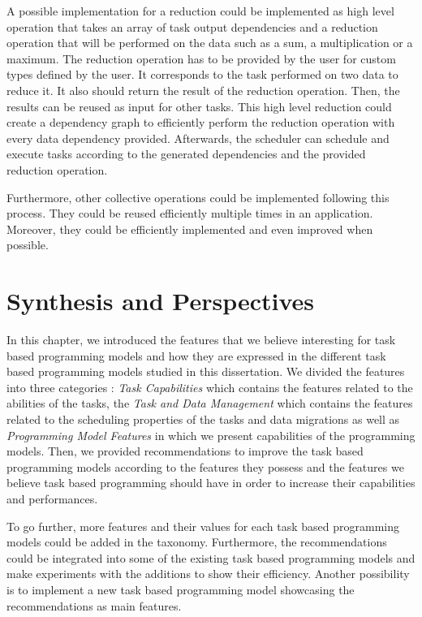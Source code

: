 A possible implementation for a reduction could be implemented as high level operation that takes an array of task output dependencies and a reduction operation that will be performed on the data such as a sum, a multiplication or a maximum.
The reduction operation has to be provided by the user for custom types defined by the user.
It corresponds to the task performed on two data to reduce it.
It also should return the result of the reduction operation.
Then, the results can be reused as input for other tasks.
This high level reduction could create a dependency graph to efficiently perform the reduction operation with every data dependency provided.
Afterwards, the scheduler can schedule and execute tasks according to the generated dependencies and the provided reduction operation.

Furthermore, other collective operations could be implemented following this process.
They could be reused efficiently multiple times in an application.
Moreover, they could be efficiently implemented and even improved when possible.

\section{Synthesis and Perspectives}
In this chapter, we introduced the features that we believe interesting for task based programming models and how they are expressed in the different task based programming models studied in this dissertation.
We divided the features into three categories : \textit{Task Capabilities} which contains the features related to the abilities of the tasks, the \textit{Task and Data Management} which contains the features related to the scheduling properties of the tasks and data migrations as well as \textit{Programming Model Features} in which we present capabilities of the programming models.
Then, we provided recommendations to improve the task based programming models according to the features they possess and the features we believe task based programming should have in order to increase their capabilities and performances.

To go further, more features and their values for each task based programming models could be added in the taxonomy.
Furthermore, the recommendations could be integrated into some of the existing task based programming models and make experiments with the additions to show their efficiency.
Another possibility is to implement a new task based programming model showcasing the recommendations as main features.
